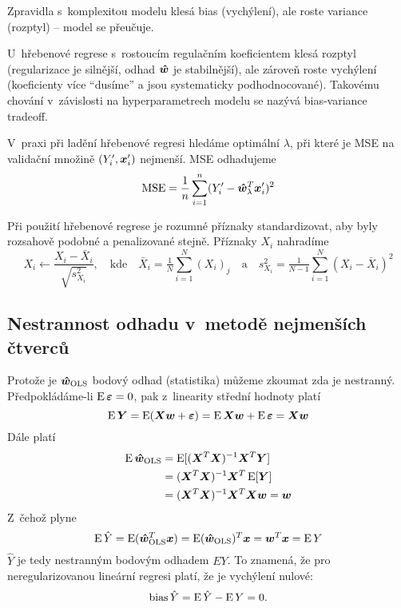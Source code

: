 Zpravidla s~komplexitou modelu klesá bias (vychýlení), ale roste variance (rozptyl) -- model se přeučuje.

U~hřebenové regrese s~rostoucím regulačním koeficientem klesá rozptyl (regularizace je silnější, odhad $\bm{\hat{w}}$ je stabilnější), ale zároveň roste vychýlení (koeficienty více ``dusíme'' a jsou systematicky podhodnocované). Takovému chování v~závislosti na hyperparametrech modelu se nazývá bias-variance tradeoff.

V~praxi při ladění hřebenové regresi hledáme optimální $\lambda$, při které je MSE na validační množině $(Y'_i, \bm{x}'_i)$ nejmenší. MSE odhadujeme
\[\operatorname{MSE} = \frac{1}{n} \sum_{i=1}^{n} (Y'_i - \bm{\hat{w}}_\lambda^T\bm{x}'_i)^2\]

Při použití hřebenové regrese je rozumné příznaky standardizovat, aby byly rozsahově podobné a penalizované stejně. Příznaky $X_i$ nahradíme
\[
    X_i \leftarrow \frac{X_i - \bar{X}_i}{\sqrt{s_{X_i}^2}},
    \quad \text{kde} \quad
    \bar{X}_i = \tfrac{1}{N} \sum_{i=1}^{N} (X_i)_j
    \quad \text{a} \quad
    s_{X_i}^2 = \tfrac{1}{N-1} \sum_{i=1}^{N} (X_i - \bar{X}_i)^2
\]

\subsection{Nestrannost odhadu v~metodě nejmenších čtverců}

Protože je $\bm{\hat{w}}_{\text{OLS}}$ bodový odhad (statistika) můžeme zkoumat zda je nestranný. Předpokládáme-li $\operatorname{E} \bm{\varepsilon} = 0$, pak z~linearity střední hodnoty platí
\[
    \operatorname{E} \bm{Y} = \operatorname{E}(\bm{X}\bm{w} + \bm{\varepsilon})
    = \operatorname{E}\bm{X}\bm{w} + \operatorname{E}\bm{\varepsilon}
    = \bm{X}\bm{w}
\]
Dále platí
\begin{align*}
    \operatorname{E}\bm{\hat{w}}_{\text{OLS}}
     & = \operatorname{E}[(\bm{X}^T\bm{X})^{-1}\bm{X}^T\bm{Y}]      \\
     & = (\bm{X}^T\bm{X})^{-1}\bm{X}^T\operatorname{E}[\bm{Y}]      \\
     & = (\bm{X}^T\bm{X})^{-1}\bm{X}^T\bm{X}\bm{w} = \bm{w}
\end{align*}
Z~čehož plyne
\[
    \operatorname{E} \hat{Y} = \operatorname{E}(\bm{\hat{w}}_{\text{OLS}}^T\bm{x}) = \operatorname{E}(\bm{\hat{w}}_{\text{OLS}})^T\bm{x} = \bm{w}^T\bm{x} = \operatorname{E} Y
\]
$\hat{Y}$ je tedy nestranným bodovým odhadem $EY$. To znamená, že pro neregularizovanou lineární regresi platí, že je vychýlení nulové:
\[\text{bias}\,\hat{Y} = \operatorname{E}\hat{Y} - \operatorname{E} Y = 0.\]
